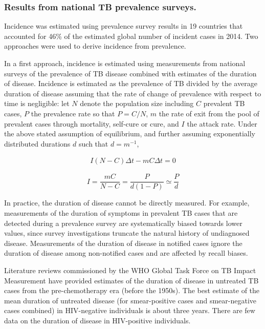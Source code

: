\subsubsection {Results from national TB prevalence surveys.} Incidence was estimated using prevalence survey results in 19 countries that accounted for 46\% of the estimated global number of incident cases in 2014. Two approaches were used to derive incidence from prevalence.

In a first approach, incidence is estimated using measurements from national surveys of the prevalence of TB disease combined with estimates of the duration of disease. Incidence is estimated as the prevalence of TB divided by the average duration of disease assuming that the rate of change of prevalence with respect to time is negligible: let $N$ denote the population size including $C$ prevalent TB cases, $P$ the prevalence rate so that $P = C/N$, $m$ the rate of exit from the pool of prevalent cases through mortality, self-cure or cure, and $I$ the attack rate. Under the above stated assumption of equilibrium, and further assuming exponentially distributed durations $d$ such that $d = m^{-1}$,

\begin{align*}
I(N - C)\Delta t - m C\Delta t = 0
\end{align*}

\begin{equation}
I = \frac{m C}{N - C} = \frac{P}{d(1 - P)} \simeq \frac{P}{d}
\label{eqn:prev2inc}
\end{equation}

In practice, the duration of disease cannot be directly measured. For example, measurements of the duration of symptoms in prevalent TB cases that are detected during a prevalence survey are systematically biased towards lower values, since survey investigations truncate the natural history of undiagnosed disease. Measurements of the duration of disease in notified cases ignore the duration of disease among non-notified cases and are affected by recall biases. 

Literature reviews commissioned by the WHO Global Task Force on TB Impact Measurement have provided estimates of the duration of disease in untreated TB cases from the pre-chemotherapy era (before the 1950s). The best estimate of the mean duration of untreated disease (for smear-positive cases and smear-negative cases combined) in HIV-negative individuals is about three years. There are few data on the duration of disease in HIV-positive individuals. 

